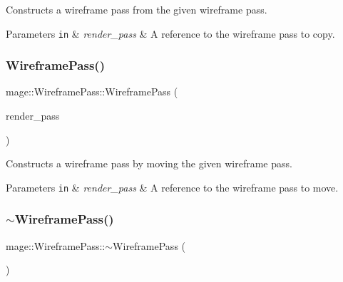Constructs a wireframe pass from the given wireframe pass.


\begin{DoxyParams}[1]{Parameters}
\mbox{\tt in}  & {\em render\+\_\+pass} & A reference to the wireframe pass to copy. \\
\hline
\end{DoxyParams}
\hypertarget{classmage_1_1_wireframe_pass_a08631bc9b341bed85b1b14b99affb1f0}{}\label{classmage_1_1_wireframe_pass_a08631bc9b341bed85b1b14b99affb1f0} 
\subsubsection{\texorpdfstring{Wireframe\+Pass()}{WireframePass()}\hspace{0.1cm}{\footnotesize\ttfamily [3/3]}}
{\footnotesize\ttfamily mage\+::\+Wireframe\+Pass\+::\+Wireframe\+Pass (\begin{DoxyParamCaption}\item[{\hyperlink{classmage_1_1_wireframe_pass}{Wireframe\+Pass} \&\&}]{render\+\_\+pass }\end{DoxyParamCaption})\hspace{0.3cm}{\ttfamily [default]}}

Constructs a wireframe pass by moving the given wireframe pass.


\begin{DoxyParams}[1]{Parameters}
\mbox{\tt in}  & {\em render\+\_\+pass} & A reference to the wireframe pass to move. \\
\hline
\end{DoxyParams}
\hypertarget{classmage_1_1_wireframe_pass_a186e4dd37ac17382872180385ec4dca1}{}\label{classmage_1_1_wireframe_pass_a186e4dd37ac17382872180385ec4dca1} 
\subsubsection{\texorpdfstring{$\sim$\+Wireframe\+Pass()}{~WireframePass()}}
{\footnotesize\ttfamily mage\+::\+Wireframe\+Pass\+::$\sim$\+Wireframe\+Pass (\begin{DoxyParamCaption}{ }\end{DoxyParamCaption})\hspace{0.3cm}{\ttfamily [default]}}

